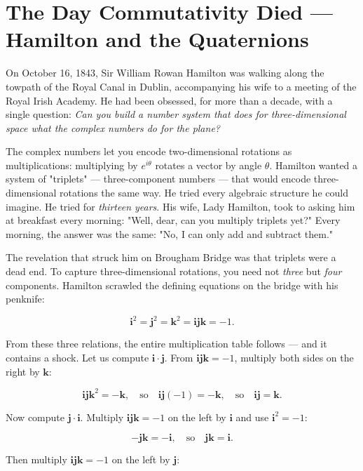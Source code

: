 \bigskip


\section{The Day Commutativity Died --- Hamilton and the Quaternions}

On October 16, 1843, Sir William Rowan Hamilton was walking along the towpath of the Royal Canal in Dublin, accompanying his wife to a meeting of the Royal Irish Academy. He had been obsessed, for more than a decade, with a single question: \textit{Can you build a number system that does for three-dimensional space what the complex numbers do for the plane?}

The complex numbers let you encode two-dimensional rotations as multiplications: multiplying by $e^{i\theta}$ rotates a vector by angle $\theta$. Hamilton wanted a system of "triplets" --- three-component numbers --- that would encode three-dimensional rotations the same way. He tried every algebraic structure he could imagine. He tried for \textit{thirteen years}. His wife, Lady Hamilton, took to asking him at breakfast every morning: "Well, dear, can you multiply triplets yet?" Every morning, the answer was the same: "No, I can only add and subtract them."

The revelation that struck him on Brougham Bridge was that triplets were a dead end. To capture three-dimensional rotations, you need not \textit{three} but \textit{four} components. Hamilton scrawled the defining equations on the bridge with his penknife:

\[
\mathbf{i}^2 = \mathbf{j}^2 = \mathbf{k}^2 = \mathbf{i}\mathbf{j}\mathbf{k} = -1.
\]

From these three relations, the entire multiplication table follows --- and it contains a shock. Let us compute $\mathbf{i} \cdot \mathbf{j}$. From $\mathbf{i}\mathbf{j}\mathbf{k} = -1$, multiply both sides on the right by $\mathbf{k}$:

\[
\mathbf{i}\mathbf{j}\mathbf{k}^2 = -\mathbf{k}, \quad \text{so} \quad \mathbf{i}\mathbf{j}(-1) = -\mathbf{k}, \quad \text{so} \quad \mathbf{i}\mathbf{j} = \mathbf{k}.
\]

Now compute $\mathbf{j} \cdot \mathbf{i}$. Multiply $\mathbf{i}\mathbf{j}\mathbf{k} = -1$ on the left by $\mathbf{i}$ and use $\mathbf{i}^2 = -1$:

\[
-\mathbf{j}\mathbf{k} = -\mathbf{i}, \quad \text{so} \quad \mathbf{j}\mathbf{k} = \mathbf{i}.
\]

Then multiply $\mathbf{i}\mathbf{j}\mathbf{k} = -1$ on the left by $\mathbf{j}$:

